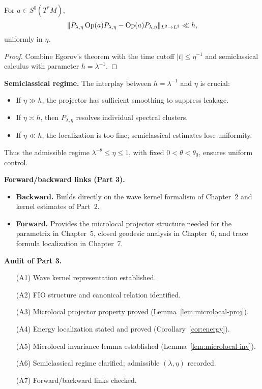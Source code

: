 \begin{lemma}\label{lem:microlocal-inv}
For $a\in S^0(T^*M)$,
\[
  \|P_{\lambda,\eta}\operatorname{Op}(a)P_{\lambda,\eta}-\operatorname{Op}(a)P_{\lambda,\eta}\|_{L^2\to L^2}
   \ll h,
\]
uniformly in $\eta$.
\end{lemma}

\begin{proof}
Combine Egorov’s theorem with the time cutoff $|t|\le \eta^{-1}$ and
semiclassical calculus with parameter $h=\lambda^{-1}$.
\end{proof}

\medskip
\noindent\textbf{Semiclassical regime.}
The interplay between $h=\lambda^{-1}$ and $\eta$ is crucial:
\begin{itemize}
  \item If $\eta\gg h$, the projector has sufficient smoothing to suppress leakage.
  \item If $\eta\asymp h$, then $P_{\lambda,\eta}$ resolves individual spectral clusters.
  \item If $\eta\ll h$, the localization is too fine; semiclassical estimates lose uniformity.
\end{itemize}
Thus the admissible regime $\lambda^{-\theta}\le \eta\le 1$, with fixed $0<\theta<\theta_0$, 
ensures uniform control.

\medskip
\noindent\textbf{Forward/backward links (Part 3).}
\begin{itemize}
  \item \textbf{Backward.} Builds directly on the wave kernel formalism of Chapter~2
  and kernel estimates of Part~2.
  \item \textbf{Forward.} Provides the microlocal projector structure needed for
  the parametrix in Chapter~5, closed geodesic analysis in Chapter~6,
  and trace formula localization in Chapter~7.
\end{itemize}

\medskip
\noindent\textbf{Audit of Part 3.}
\begin{itemize}
  \item[(A1)] Wave kernel representation established.
  \item[(A2)] FIO structure and canonical relation identified.
  \item[(A3)] Microlocal projector property proved (Lemma~\ref{lem:microlocal-proj}).
  \item[(A4)] Energy localization stated and proved (Corollary~\ref{cor:energy}).
  \item[(A5)] Microlocal invariance lemma established (Lemma~\ref{lem:microlocal-inv}).
  \item[(A6)] Semiclassical regime clarified; admissible $(\lambda,\eta)$ recorded.
  \item[(A7)] Forward/backward links checked.
\end{itemize}

